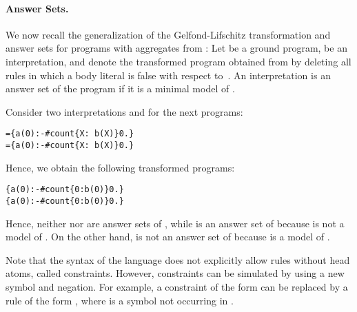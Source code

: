 \documentclass{tlp}
\begin{document}
\paragraph{Answer Sets.}
We now recall the generalization of the Gelfond-Lifschitz transformation and answer sets for programs with aggregates from :
Let  be a ground program,  be an interpretation, and  denote the transformed program obtained from  by deleting all rules in which a body literal is false with respect to\ .
An interpretation  is an answer set of the program  if it is a minimal model of .

\begin{example}\label{ex:simple-trans}
Consider two interpretations   and   for the next programs:
\begin{alltt}\small
  = \{a(0) :- #count\{X:\ b(X)\}  0.\}
  = \{a(0) :- #count\{X:\ b(X)\}  0.\}
\end{alltt}\normalsize
Hence, we obtain the following transformed programs:
\begin{alltt}\small
   
     \{a(0) :- #count\{0: b(0)\}  0.\}
     \{a(0) :- #count\{0: b(0)\}  0.\}
   
\end{alltt}\normalsize
Hence, neither  nor  are answer sets of , while  is an answer set of  because  is not a model of .
On the other hand,  is not an answer set of  because  is a model of .
\punto
\end{example}


Note that the syntax of the language does not explicitly allow rules without head atoms, called constraints.
However, constraints can be simulated by using a new symbol and negation.
For example, a constraint of the form  can be replaced by a rule of the form , where  is a symbol not occurring in \p.
\end{document}
